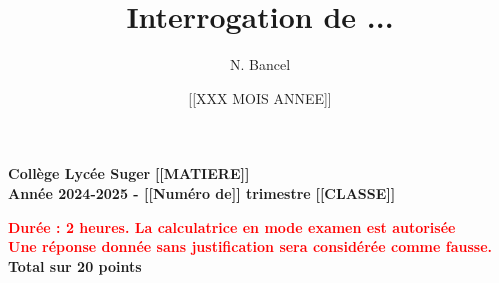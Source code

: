 \documentclass[answers]{exam}
\title{Interrogation de ...}
\author{N. Bancel}
\date{[[XXX MOIS ANNEE]]}
\begin{document}
\textbf{Collège Lycée Suger}
\hfill
\textbf{[[MATIERE]]} \\

\textbf{Année 2024-2025 - [[Numéro de]] trimestre}
\hfill
\textbf{[[CLASSE]]} \par

{\let\newpage\relax\maketitle}

\begin{center}
\textbf{\textcolor{red}{Durée : 2 heures. La calculatrice en mode examen est autorisée}} \\
\textbf{\textcolor{red}{Une réponse donnée sans justification sera considérée comme fausse.}} \\
\textbf{Total sur 20 points }
\end{center}
\end{document}
